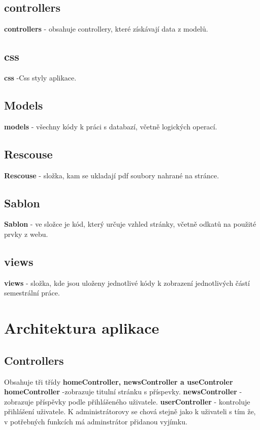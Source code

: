 \documentclass[12pt]{report}
\begin{document}
\section{controllers}
\textbf{controllers} - obsahuje controllery, které získávají data z modelů.


\section{css}
\textbf{css} -Css styly aplikace.

\section{Models}
\textbf{models} - všechny kódy k práci s databazí, včetně logických operací.

\section{Rescouse}
\textbf{Rescouse} - složka, kam se ukladají pdf soubory nahrané na stránce.

\section{Sablon}
\textbf{Sablon} - ve složce je kód, který určuje vzhled stránky, včetně odkatů na použité prvky z webu.

\section{views}
\textbf{views} - složka, kde jsou uloženy jednotlivé kódy k zobrazení jednotlivých částí semestrální práce.




\chapter{Architektura aplikace}
\section{Controllers}
Obsahuje tři třídy \textbf{homeController, newsController a useControler}
\newline
\textbf{homeController}  -zobrazuje titulní stránku s příspevky. \newline
\textbf{newsController} -  zobrazuje příspěvky podle přihlášeného uživatele.\newline
\textbf{userController}  - kontroluje přihlášení uživatele. K administrátorovy se chová stejně jako k uživateli s tím že, v potřebných funkcích má adminstrátor přidanou vyjímku.
\end{document}

